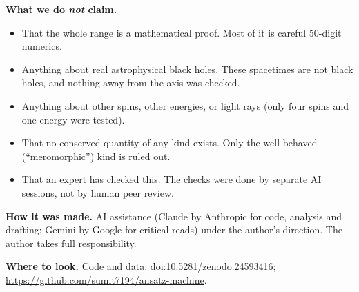 \documentclass[11pt,a4paper]{article}
\begin{document}
\textbf{What we do \emph{not} claim.}
\begin{itemize}\itemsep2pt
\item That the whole range is a mathematical proof. Most of it is careful 50-digit numerics.
\item Anything about real astrophysical black holes. These spacetimes are not black holes, and nothing away from the
axis was checked.
\item Anything about other spins, other energies, or light rays (only four spins and one energy were tested).
\item That no conserved quantity of any kind exists. Only the well-behaved (``meromorphic'') kind is ruled out.
\item That an expert has checked this. The checks were done by separate AI sessions, not by human peer review.
\end{itemize}

\textbf{How it was made.} AI assistance (Claude by Anthropic for code, analysis and drafting; Gemini by Google for
critical reads) under the author's direction. The author takes full responsibility.

\textbf{Where to look.} Code and data: \href{https://doi.org/10.5281/zenodo.24593416}{doi:10.5281/zenodo.24593416};
\url{https://github.com/sumit7194/ansatz-machine}.
\end{document}
